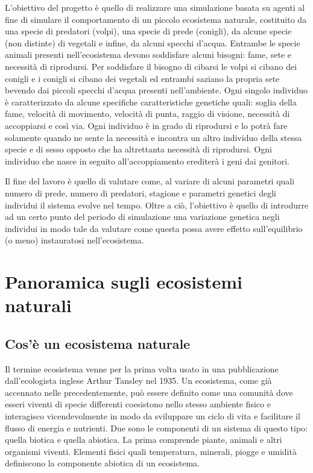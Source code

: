 \documentclass[11pt]{article}
\begin{document}
L'obiettivo del progetto è quello di realizzare una simulazione basata su agenti al fine di simulare il comportamento di un piccolo ecosistema naturale, costituito da una specie di predatori (volpi), una specie di prede (conigli), da alcune specie (non distinte) di vegetali e infine, da alcuni specchi d'acqua. Entrambe le specie animali presenti nell'ecosistema devono soddisfare alcuni bisogni: fame, sete e necessità di riprodursi. Per soddisfare il bisogno di cibarsi le volpi si cibano dei conigli e i conigli si cibano dei vegetali ed entrambi saziano la propria sete bevendo dai piccoli specchi d'acqua presenti nell'ambiente. Ogni singolo individuo è caratterizzato da alcune specifiche caratteristiche genetiche quali: soglia della fame, velocità di movimento, velocità di punta, raggio di visione, necessità di accoppiarsi e così via. Ogni individuo è in grado di riprodursi e lo potrà fare solamente quando ne sente la necessità e incontra un altro individuo della stessa specie e di sesso opposto che ha altrettanta necessità di riprodursi. Ogni individuo che nasce in seguito all'accoppiamento erediterà i geni dai genitori.  

Il fine del lavoro è quello di valutare come, al variare di alcuni parametri quali numero di prede, numero di predatori, stagione e parametri genetici degli individui il sistema evolve nel tempo. Oltre a ciò, l'obiettivo è quello di introdurre ad un certo punto del periodo di simulazione una variazione genetica negli individui in modo tale da valutare come questa possa avere effetto sull'equilibrio (o meno) instauratosi nell'ecosistema. 


\newpage
\section{Panoramica sugli ecosistemi naturali}
\subsection{Cos'è un ecosistema naturale}
Il termine ecosistema venne per la prima volta usato in una pubblicazione dall'ecologista inglese Arthur Tansley nel 1935.\cite{WikiEcosystem}
Un ecosistema\cite{Vedantu}, come già accennato nelle precedentemente, può essere definito come una comunità dove esseri viventi di specie differenti coesistono nello stesso ambiente fisico e interagisco vicendevolmente in modo da sviluppare un ciclo di vita e facilitare il flusso di energia e nutrienti. 
Due sono le componenti di un sistema di questo tipo: quella biotica e quella abiotica. La prima comprende piante, animali e altri organismi viventi. Elementi fisici quali temperatura, minerali, piogge e umidità definiscono la componente abiotica di un ecosistema. 
\end{document}
